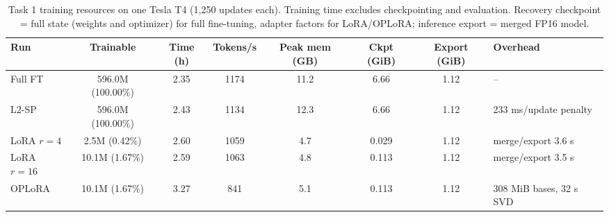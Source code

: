 \begin{table}[htbp]
\centering
\footnotesize
\caption{Task 1 training resources on one Tesla T4 (1{,}250 updates each). Training time excludes checkpointing and evaluation. Recovery checkpoint = full state (weights and optimizer) for full fine-tuning, adapter factors for LoRA/OPLoRA; inference export = merged FP16 model.}
\label{tab:t1-resources}
\begin{adjustbox}{max width=\linewidth}
\begin{tabular}{lccccccl}
\toprule
Run & Trainable & Time (h) & Tokens/s & Peak mem (GB) & Ckpt (GiB) & Export (GiB) & Overhead \\
\midrule
Full FT & 596.0M (100.00\%) & 2.35 & 1174 & 11.2 & 6.66 & 1.12 & -- \\
L2-SP & 596.0M (100.00\%) & 2.43 & 1134 & 12.3 & 6.66 & 1.12 & 233 ms/update penalty \\
LoRA $r{=}4$ & 2.5M (0.42\%) & 2.60 & 1059 & 4.7 & 0.029 & 1.12 & merge/export 3.6 s \\
LoRA $r{=}16$ & 10.1M (1.67\%) & 2.59 & 1063 & 4.8 & 0.113 & 1.12 & merge/export 3.5 s \\
OPLoRA & 10.1M (1.67\%) & 3.27 & 841 & 5.1 & 0.113 & 1.12 & 308 MiB bases, 32 s SVD \\
\bottomrule
\end{tabular}
\end{adjustbox}
\end{table}
